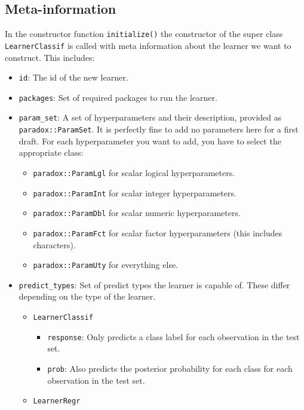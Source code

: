 \documentclass[
  11pt,
  parskip=half,
  DIV=calc,
  BCOR=10mm,
  x11names]{scrbook}
\providecommand{\tightlist}{%
  \setlength{\itemsep}{0pt}\setlength{\parskip}{0pt}}
\begin{document}
\hypertarget{learner-meta-information}{%
\subsection{Meta-information}\label{learner-meta-information}}

In the constructor function \texttt{initialize()} the constructor of the super class \texttt{LearnerClassif} is called with meta information about the learner we want to construct.
This includes:

\begin{itemize}
\tightlist
\item
  \texttt{id}: The id of the new learner.
\item
  \texttt{packages}: Set of required packages to run the learner.
\item
  \texttt{param\_set}: A set of hyperparameters and their description, provided as \texttt{paradox::ParamSet}.
  It is perfectly fine to add no parameters here for a first draft.
  For each hyperparameter you want to add, you have to select the appropriate class:

  \begin{itemize}
  \tightlist
  \item
    \texttt{paradox::ParamLgl} for scalar logical hyperparameters.
  \item
    \texttt{paradox::ParamInt} for scalar integer hyperparameters.
  \item
    \texttt{paradox::ParamDbl} for scalar numeric hyperparameters.
  \item
    \texttt{paradox::ParamFct} for scalar factor hyperparameters (this includes characters).
  \item
    \texttt{paradox::ParamUty} for everything else.
  \end{itemize}
\item
  \texttt{predict\_types}: Set of predict types the learner is capable of.
  These differ depending on the type of the learner.

  \begin{itemize}
  \tightlist
  \item
    \texttt{LearnerClassif}

    \begin{itemize}
    \tightlist
    \item
      \texttt{response}: Only predicts a class label for each observation in the test set.
    \item
      \texttt{prob}: Also predicts the posterior probability for each class for each observation in the test set.
    \end{itemize}
  \item
    \texttt{LearnerRegr}


\end{itemize}
\end{itemize}
\end{document}
